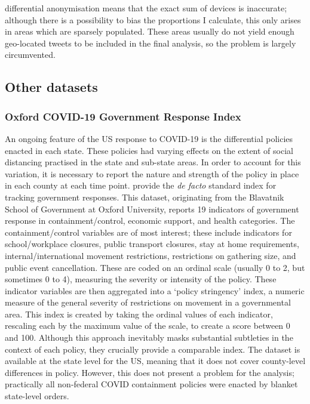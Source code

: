 \documentclass{article}
\begin{document}
differential anonymisation means that the exact sum of devices is inaccurate; although there is a possibility to bias the proportions I calculate, this only arises in areas which are sparsely populated. These areas usually do not yield enough geo-located tweets to be included in the final analysis, so the problem is largely circumvented.

\subsection{Other datasets}
\subsubsection{Oxford COVID-19 Government Response Index}
An ongoing feature of the US response to COVID-19 is the differential policies enacted in each state. These policies had varying effects on the extent of social distancing practised in the state and sub-state areas. In order to account for this variation, it is necessary to report the nature and strength of the policy in place in each county at each time point. \textcite{petherickVariationGovernmentResponses2020} provide the \textit{de facto} standard index for tracking government responses. This dataset, originating from the Blavatnik School of Government at Oxford University, reports 19 indicators of government response in containment/control, economic support, and health categories. The containment/control variables are of most interest; these include indicators for school/workplace closures, public transport closures, stay at home requirements, internal/international movement restrictions, restrictions on gathering size, and public event cancellation. These are coded on an ordinal scale (usually 0 to 2, but sometimes 0 to 4), measuring the severity or intensity of the policy. These indicator variables are then aggregated into a `policy stringency' index, a numeric measure of the general severity of restrictions on movement in a governmental area. This index is created by taking the ordinal values of each indicator, rescaling each by the maximum value of the scale, to create a score between 0 and 100. Although this approach inevitably masks substantial subtleties in the context of each policy, they crucially provide a comparable index. The dataset is available at the state level for the US, meaning that it does not cover county-level differences in policy. However, this does not present a problem for the analysis; practically all non-federal COVID containment policies were enacted by blanket state-level orders.
\end{document}
